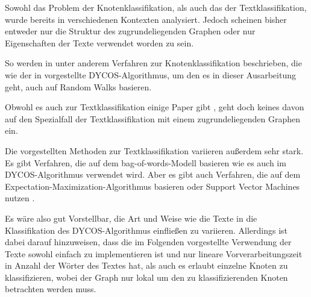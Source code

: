 Sowohl das Problem der Knotenklassifikation, als auch das der
Textklassifikation, wurde bereits in verschiedenen Kontexten analysiert. Jedoch
scheinen bisher entweder nur die Struktur des zugrundeliegenden Graphen oder
nur Eigenschaften der Texte verwendet worden zu sein.

So werden in \cite{bhagat,szummer} unter anderem Verfahren zur
Knotenklassifikation beschrieben, die wie der in \cite{aggarwal2011}
vorgestellte DYCOS-Algorithmus, um den es in dieser Ausarbeitung geht, auch auf
Random Walks basieren.

Obwohl es auch zur Textklassifikation einige Paper gibt
\cite{Zhu02learningfrom,Jiang2010302}, geht doch keines davon auf den
Spezialfall der Textklassifikation mit einem zugrundeliegenden Graphen ein.

Die vorgestellten Methoden zur Textklassifikation variieren außerdem sehr
stark. Es gibt Verfahren, die auf dem bag-of-words-Modell basieren
\cite{Ko:2012:STW:2348283.2348453} wie es auch im DYCOS-Algorithmus verwendet
wird. Aber es gibt auch Verfahren, die auf dem
Expectation-Maximization-Algorithmus basieren \cite{Nigam99textclassification}
oder Support Vector
Machines nutzen \cite{Joachims98textcategorization}.

Es wäre also gut Vorstellbar, die Art und Weise wie die Texte in die
Klassifikation des DYCOS-Algorithmus einfließen zu variieren. Allerdings ist
dabei darauf hinzuweisen, dass die im Folgenden vorgestellte Verwendung der
Texte sowohl einfach zu implementieren ist und nur lineare Vorverarbeitungszeit
in Anzahl der Wörter des Textes hat, als auch es erlaubt einzelne Knoten zu
klassifizieren, wobei der Graph nur lokal um den zu klassifizierenden Knoten
betrachten werden muss.

